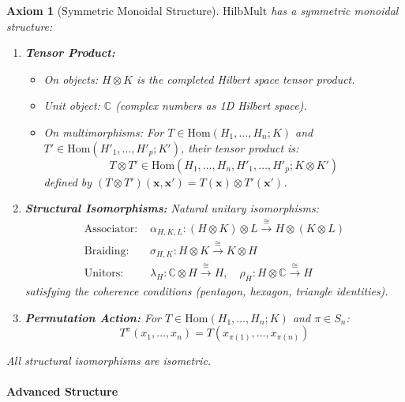 \documentclass[11pt]{article}
\newtheorem{axiom}{Axiom}
\begin{document}
\begin{axiom}[Symmetric Monoidal Structure]\label{ax:H5}
$\mathrm{HilbMult}$ has a symmetric monoidal structure:
\begin{enumerate}[label=(\alph*)]
    \item \textbf{Tensor Product:} 
    \begin{itemize}
        \item On objects: $H \otimes K$ is the completed Hilbert space tensor product.
        \item Unit object: $\mathbb{C}$ (complex numbers as 1D Hilbert space).
        \item On multimorphisms: For $T \in \mathrm{Hom}(H_1,\dots,H_n;K)$ and $T' \in \mathrm{Hom}(H'_1,\dots,H'_p;K')$, their tensor product is:
        \[
        T \otimes T' \in \mathrm{Hom}(H_1,\dots,H_n,H'_1,\dots,H'_p; K \otimes K')
        \]
        defined by $(T \otimes T')(\mathbf{x}, \mathbf{x}') = T(\mathbf{x}) \otimes T'(\mathbf{x}')$.
    \end{itemize}
    
    \item \textbf{Structural Isomorphisms:} Natural unitary isomorphisms:
    \begin{align*}
        \text{Associator: } &\alpha_{H,K,L}: (H \otimes K) \otimes L \xrightarrow{\cong} H \otimes (K \otimes L) \\
        \text{Braiding: } &\sigma_{H,K}: H \otimes K \xrightarrow{\cong} K \otimes H \\
        \text{Unitors: } &\lambda_H: \mathbb{C} \otimes H \xrightarrow{\cong} H, \quad \rho_H: H \otimes \mathbb{C} \xrightarrow{\cong} H
    \end{align*}
    satisfying the coherence conditions (pentagon, hexagon, triangle identities).
    
    \item \textbf{Permutation Action:} For $T \in \mathrm{Hom}(H_1,\dots,H_n;K)$ and $\pi \in S_n$:
    \[
    T^\pi(x_1,\dots,x_n) = T(x_{\pi(1)},\dots,x_{\pi(n)})
    \]
\end{enumerate}
All structural isomorphisms are isometric.
\end{axiom}

\paragraph{Advanced Structure}
\end{document}
